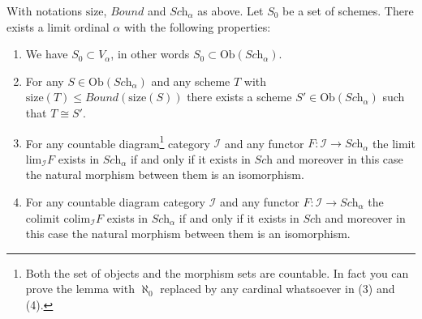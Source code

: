 \begin{lemma}
\label{lemma-construct-category}
With notations $\text{size}$, $Bound$ and $\textit{Sch}_\alpha$ as above.
Let $S_0$ be a set of schemes. There exists a limit ordinal
$\alpha$ with the following properties:
\begin{enumerate}
\item We have $S_0 \subset V_\alpha$, in other words
$S_0 \subset \text{Ob}(\textit{Sch}_\alpha)$.
\label{inclusion}
\item For any $S \in \text{Ob}(\textit{Sch}_\alpha)$ and any
scheme $T$ with $\text{size}(T) \leq Bound(\text{size}(S))$
there exists a scheme $S' \in \text{Ob}(\textit{Sch}_\alpha)$
such that $T \cong S'$.
\label{bounded}
\item For any countable diagram\footnote{Both the set of objects and
the morphism sets are countable. In fact you can prove the lemma with
$\aleph_0$ replaced by any cardinal whatsoever in (3) and (4).}
category $\mathcal{I}$ and
any functor $F : \mathcal{I} \to \textit{Sch}_\alpha$ the limit
$\text{lim}_\mathcal{I} F$ exists in $\textit{Sch}_\alpha$ if and
only if it exists in $\textit{Sch}$ and moreover in this case
the natural morphism between them is an isomorphism.
\label{limit}
\item For any countable diagram category $\mathcal{I}$ and
any functor $F : \mathcal{I} \to \textit{Sch}_\alpha$ the colimit
$\text{colim}_\mathcal{I} F$ exists in $\textit{Sch}_\alpha$ if and
only if it exists in $\textit{Sch}$ and moreover in this case
the natural morphism between them is an isomorphism.
\label{colimit}
\end{enumerate}
\end{lemma}

